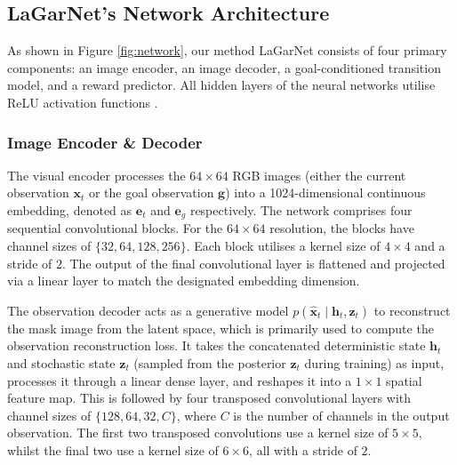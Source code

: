 \documentclass[journal]{IEEEtran}
\begin{document}
\subsection{LaGarNet's Network Architecture} \label{sec:architecture}

As shown in Figure \ref{fig:network}, our method LaGarNet consists of four primary components: an image encoder, an image decoder, a goal-conditioned transition model, and a reward predictor. All hidden layers of the neural networks utilise ReLU activation functions \cite{fukushima1975cognitron}.

\subsubsection{Image Encoder \& Decoder} The visual encoder processes the $64 \times 64$ RGB images (either the current observation $\bm{x}_t$ or the goal observation $\bm{g}$) into a 1024-dimensional continuous embedding, denoted as $\bm{e}_t$ and $\bm{e}_g$ respectively. The network comprises four sequential convolutional blocks. For the $64 \times 64$ resolution, the blocks have channel sizes of $\{32, 64, 128, 256\}$. Each block utilises a kernel size of $4 \times 4$ and a stride of $2$. The output of the final convolutional layer is flattened and projected via a linear layer to match the designated embedding dimension.

The observation decoder acts as a generative model $p(\hat{\bm{x}}_t \;|\; \bm{h}_t, \bm{z}_t)$ to reconstruct the mask image from the latent space, which is primarily used to compute the observation reconstruction loss. It takes the concatenated deterministic state $\bm{h}_t$ and stochastic state $\bm{z}_t$ (sampled from the posterior $\hat{\bm{z}}_t$ during training) as input, processes it through a linear dense layer, and reshapes it into a $1 \times 1$ spatial feature map. This is followed by four transposed convolutional layers with channel sizes of $\{128, 64, 32, C\}$, where $C$ is the number of channels in the output observation. The first two transposed convolutions use a kernel size of $5 \times 5$, whilst the final two use a kernel size of $6 \times 6$, all with a stride of $2$.
\end{document}
